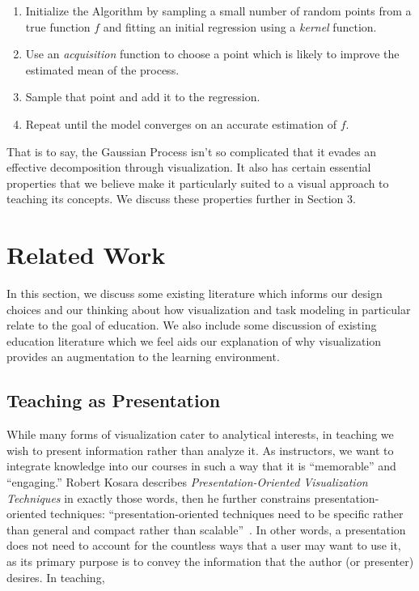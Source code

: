 \documentclass{vgtc}                          %
\begin{document}
\begin{enumerate}

	\item Initialize the Algorithm by sampling a small number of random
		points from a true function $f$ and fitting an initial
		regression using a \textit{kernel} function.

	\item Use an \textit{acquisition} function to choose a point which is
		likely to improve the estimated mean of the process.

	\item Sample that point and add it to the regression.

	\item Repeat until the model converges on an accurate estimation of
		$f$.

\end{enumerate}

That is to say, the Gaussian Process isn't so complicated that it evades an
effective decomposition through visualization. It also has certain essential
properties that we believe make it particularly suited to a visual approach to
teaching its concepts. We discuss these properties further in Section 3.

\section{Related Work}

In this section, we discuss some existing literature which informs our design
choices and our thinking about how visualization and task modeling in particular
relate to the goal of education. We also include some discussion of existing
education literature which we feel aids our explanation of why visualization
provides an augmentation to the learning environment.

\subsection{Teaching as Presentation}

While many forms of visualization cater to analytical interests, in teaching we
wish to present information rather than analyze it. As instructors, we want to
integrate knowledge into our courses in such a way that it is ``memorable'' and
``engaging.'' Robert Kosara describes \textit{Presentation-Oriented
Visualization Techniques} in exactly those words, then he further constrains
presentation-oriented techniques: ``presentation-oriented techniques need to be
specific rather than general and compact rather than scalable''~\cite{Kosara}.
In other words, a presentation does not need to account for the countless ways
that a user may want to use it, as its primary purpose is to convey the
information that the author (or presenter) desires. In teaching, 
\end{document}
